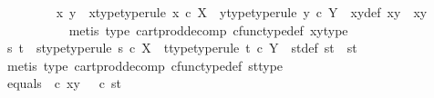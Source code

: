 \begin{isabellebody}
\ \ \ \ \ \ \ \isamarkupfalse%
\ x\ y\ \ x{\isacharunderscore}{\kern0pt}type{\isacharbrackleft}{\kern0pt}type{\isacharunderscore}{\kern0pt}rule{\isacharbrackright}{\kern0pt}{\isacharcolon}{\kern0pt}\ {\isachardoublequoteopen}x\ {\isasymin}\isactrlsub c\ X{\isachardoublequoteclose}\ \ y{\isacharunderscore}{\kern0pt}type{\isacharbrackleft}{\kern0pt}type{\isacharunderscore}{\kern0pt}rule{\isacharbrackright}{\kern0pt}{\isacharcolon}{\kern0pt}\ {\isachardoublequoteopen}y\ {\isasymin}\isactrlsub c\ Y{\isachardoublequoteclose}\ \ xy{\isacharunderscore}{\kern0pt}def{\isacharcolon}{\kern0pt}\ {\isachardoublequoteopen}xy\ {\isacharequal}{\kern0pt}\ {\isasymlangle}x{\isacharcomma}{\kern0pt}y{\isasymrangle}{\isachardoublequoteclose}\isanewline
\ \ \ \ \ \ \ \ \ \isamarkupfalse%
\ {\isacharparenleft}{\kern0pt}metis\ {\isasymTheta}{\isacharunderscore}{\kern0pt}type\ cart{\isacharunderscore}{\kern0pt}prod{\isacharunderscore}{\kern0pt}decomp\ cfunc{\isacharunderscore}{\kern0pt}type{\isacharunderscore}{\kern0pt}def\ xy{\isacharunderscore}{\kern0pt}type{\isacharparenright}{\kern0pt}\isanewline
\ \ \ \ \ \ \ \isamarkupfalse%
\ s\ t\ \ s{\isacharunderscore}{\kern0pt}type{\isacharbrackleft}{\kern0pt}type{\isacharunderscore}{\kern0pt}rule{\isacharbrackright}{\kern0pt}{\isacharcolon}{\kern0pt}\ {\isachardoublequoteopen}s\ {\isasymin}\isactrlsub c\ X{\isachardoublequoteclose}\ \ t{\isacharunderscore}{\kern0pt}type{\isacharbrackleft}{\kern0pt}type{\isacharunderscore}{\kern0pt}rule{\isacharbrackright}{\kern0pt}{\isacharcolon}{\kern0pt}\ {\isachardoublequoteopen}t\ {\isasymin}\isactrlsub c\ Y{\isachardoublequoteclose}\ \ st{\isacharunderscore}{\kern0pt}def{\isacharcolon}{\kern0pt}\ {\isachardoublequoteopen}st\ {\isacharequal}{\kern0pt}\ {\isasymlangle}s{\isacharcomma}{\kern0pt}t{\isasymrangle}{\isachardoublequoteclose}\isanewline
\ \ \ \ \ \ \ \ \ \isamarkupfalse%
\ {\isacharparenleft}{\kern0pt}metis\ {\isasymTheta}{\isacharunderscore}{\kern0pt}type\ cart{\isacharunderscore}{\kern0pt}prod{\isacharunderscore}{\kern0pt}decomp\ cfunc{\isacharunderscore}{\kern0pt}type{\isacharunderscore}{\kern0pt}def\ st{\isacharunderscore}{\kern0pt}type{\isacharparenright}{\kern0pt}\ \ \ \isanewline
\ \ \ \ \ \ \ \isamarkupfalse%
\ equals{}{\isacharcolon}{\kern0pt}\ {\isachardoublequoteopen}{\isasymTheta}\ {\isasymcirc}\isactrlsub c\ {\isasymlangle}x{\isacharcomma}{\kern0pt}y{\isasymrangle}\ {\isacharequal}{\kern0pt}\ {\isasymTheta}\ {\isasymcirc}\isactrlsub c\ {\isasymlangle}s{\isacharcomma}{\kern0pt}t{\isasymrangle}{\isachardoublequoteclose}\isanewline

\end{isabellebody}
